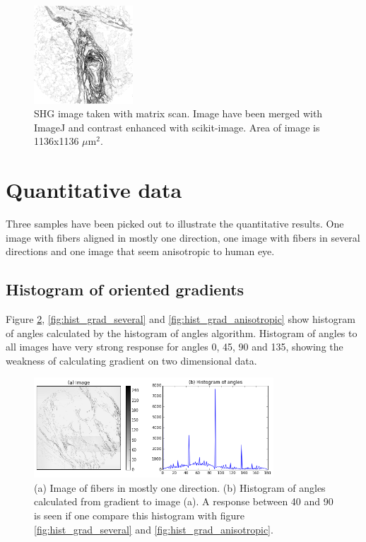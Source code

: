 \begin{figure}[h]
\centering
\includegraphics[width=0.33\textwidth]{single}
\caption{SHG image taken with matrix scan. Image have been merged with ImageJ and contrast enhanced with scikit-image. Area of image is 1136x1136 $\mu$m$^2$.}
\label{fig:single}
\end{figure}


%
%
\section{Quantitative data}
Three samples have been picked out to illustrate the quantitative results. One image with fibers aligned in mostly one direction, one image with fibers in several directions and one image that seem anisotropic to human eye.

% 
\subsection{Histogram of oriented gradients}
Figure \ref{fig:hist_grad_one}, \ref{fig:hist_grad_several} and \ref{fig:hist_grad_anisotropic} show histogram of angles calculated by the histogram of angles algorithm. Histogram of angles to all images have very strong response for angles 0, 45, 90 and 135, showing the weakness of calculating gradient on two dimensional data.

\begin{figure}[H]
\centering
\includegraphics[width=0.8\textwidth]{hist_grad_one}
\caption{(a) Image of fibers in mostly one direction. (b) Histogram of angles calculated from gradient to image (a). A response between 40 and 90 is seen if one compare this histogram with figure \ref{fig:hist_grad_several} and \ref{fig:hist_grad_anisotropic}.}
\label{fig:hist_grad_one}
\end{figure}

